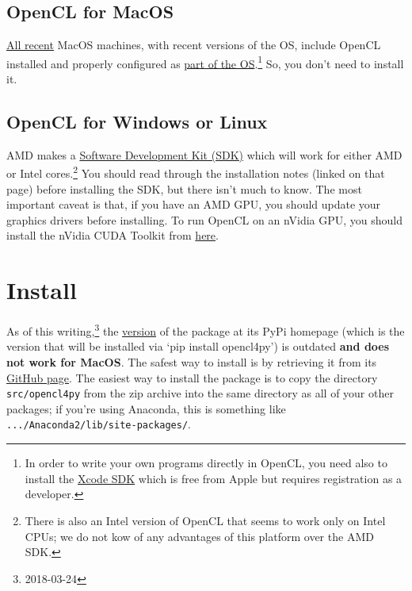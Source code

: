 \documentclass[12pt,pdftex,letterpaper]{article}
\newcommand{\now}{2018-03-24}
\begin{document}

\subsection{OpenCL for MacOS}

\href{https://support.apple.com/en-us/HT202823}{All recent} MacOS machines, with recent versions of the OS, include OpenCL installed and properly configured as \href{file:////System/Library/Frameworks/OpenCL.framework/OpenCL}{part of the OS}.\footnote{In order to write your own programs directly in OpenCL, you need also to install the \href{https://developer.apple.com/xcode/downloads/}{Xcode SDK} which is free from Apple but requires registration as a developer.} So, you don't need to install it.

\subsection{OpenCL for Windows or Linux}

AMD makes a \href{https://developer.amd.com/amd-accelerated-parallel-processing-app-sdk/}{Software Development Kit (SDK)} which will work for either AMD or Intel cores.\footnote{There is also an Intel version of OpenCL that seems to work only on Intel CPUs; we do not kow of any advantages of this platform over the AMD SDK.}  You should read through the installation notes (linked on that page) before installing the SDK, but there isn't much to know.  The most important caveat is that, if you have an AMD GPU, you should update your graphics drivers before installing.  To run OpenCL on an nVidia GPU, you should install the nVidia CUDA Toolkit from \href{https://developer.nvidia.com/cuda-downloads}{here}.

\section{Install \oclpy}

As of this writing,\footnote{\now} the  \href{https://pypi.python.org/pypi/opencl4py/1.0.1}{version} of the \oclpy package at its PyPi homepage (which is the version that will be installed via `pip install opencl4py') is outdated {\bf and does not work for MacOS}. The safest way to install {\oclpy} is by retrieving it from its \href{https://github.com/ajkxyz/opencl4py}{GitHub page}. The easiest way to install the package is to copy the directory \texttt{src/opencl4py} from the zip archive into the same directory as all of your other packages; if you're using Anaconda, this is something like \texttt{.../Anaconda2/lib/site-packages/}.
\end{document}
